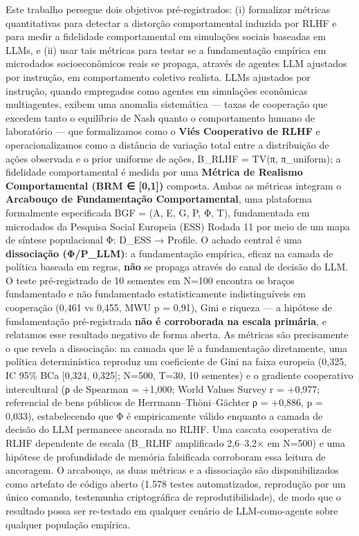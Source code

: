 
Este trabalho persegue dois objetivos pré-registrados: (i) formalizar métricas quantitativas para detectar a distorção comportamental induzida por RLHF e para medir a fidelidade comportamental em simulações sociais baseadas em LLMs, e (ii) usar tais métricas para testar se a fundamentação empírica em microdados socioeconômicos reais se propaga, através de agentes LLM ajustados por instrução, em comportamento coletivo realista. LLMs ajustados por instrução, quando empregados como agentes em simulações econômicas multiagentes, exibem uma anomalia sistemática --- taxas de cooperação que excedem tanto o equilíbrio de Nash quanto o comportamento humano de laboratório --- que formalizamos como o \textbf{Viés Cooperativo de RLHF} e operacionalizamos como a distância de variação total entre a distribuição de ações observada e o prior uniforme de ações, B\_RLHF = TV(π, π\_uniform); a fidelidade comportamental é medida por uma \textbf{Métrica de Realismo Comportamental (BRM ∈ [0,1])} composta. Ambas as métricas integram o \textbf{Arcabouço de Fundamentação Comportamental}, uma plataforma formalmente especificada BGF = (A, E, G, P, Φ, T), fundamentada em microdados da Pesquisa Social Europeia (ESS) Rodada 11 por meio de um mapa de síntese populacional Φ: D\_ESS → Profile. O achado central é uma \textbf{dissociação (Φ/P\_LLM)}: a fundamentação empírica, eficaz na camada de política baseada em regras, \textbf{não} se propaga através do canal de decisão do LLM. O teste pré-registrado de 10 sementes em N=100 encontra os braços fundamentado e não fundamentado estatisticamente indistinguíveis em cooperação (0,461 vs 0,455, MWU p = 0,91), Gini e riqueza --- a hipótese de fundamentação pré-registrada \textbf{não é corroborada na escala primária}, e relatamos esse resultado negativo de forma aberta. As métricas são precisamente o que revela a dissociação: na camada que lê a fundamentação diretamente, uma política determinística reproduz um coeficiente de Gini na faixa europeia (0,325, IC 95\% BCa [0,324, 0,325]; N=500, T=30, 10 sementes) e o gradiente cooperativo intercultural (ρ de Spearman = +1,000; World Values Survey r = +0,977; referencial de bens públicos de Herrmann--Thöni--Gächter ρ = +0,886, p = 0,033), estabelecendo que Φ é empiricamente válido enquanto a camada de decisão do LLM permanece ancorada no RLHF. Uma cascata cooperativa de RLHF dependente de escala (B\_RLHF amplificado 2,6--3,2× em N=500) e uma hipótese de profundidade de memória falsificada corroboram essa leitura de ancoragem. O arcabouço, as duas métricas e a dissociação são disponibilizados como artefato de código aberto (1.578 testes automatizados, reprodução por um único comando, testemunha criptográfica de reprodutibilidade), de modo que o resultado possa ser re-testado em qualquer cenário de LLM-como-agente sobre qualquer população empírica.

